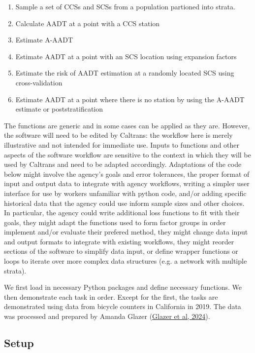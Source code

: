 \documentclass[11pt]{article}
\providecommand{\tightlist}{%
      \setlength{\itemsep}{0pt}\setlength{\parskip}{0pt}}
\begin{document}
\begin{enumerate}
\def\labelenumi{\arabic{enumi}.}
\tightlist
\item
  Sample a set of CCSs and SCSs from a population partioned into strata.
\item
  Calculate AADT at a point with a CCS station
\item
  Estimate A-AADT
\item
  Estimate AADT at a point with an SCS location using expansion factors
\item
  Estimate the risk of AADT estimation at a randomly located SCS using
  cross-validation
\item
  Estimate AADT at a point where there is no station by using the A-AADT
  estimate or poststratification
\end{enumerate}

The functions are generic and in some cases can be applied as they are. 
However, the software will need to be edited by Caltrans: the workflow here is merely illustrative and not intended for immediate use. 
Inputs to functions and other aspects of the software workflow are sensitive to the context in which they will be used by Caltrans and need to be adapted accordingly. 
Adaptations of the code below might involve the agency's goals and error tolerances, the proper format of input and output data to integrate with agency workflows, writing a simpler user interface for use by workers unfamiliar with python code, and/or adding specific historical data that the agency could use inform sample sizes and other choices. 
In particular, the agency could write additional loss functions to fit with their goals, they might adapt the functions used to form factor groups in order implement and/or evaluate their prefered method, they might change data input and output formats to integrate with existing workflows, they might reorder sections of the software to simplify data input, or define wrapper functions or loops to iterate over more complex data structures (e.g. a network with multiple strata).  


We first load in necessary Python packages and define necessary
functions. We then demonstrate each task in order. Except for the first,
the tasks are demonstrated using data from bicycle counters in
California in 2019. The data was processed and prepared by Amanda Glazer
(\href{https://www.researchgate.net/publication/377362665_DATA_CHECKS_FOR_BICYCLE_AND_PEDESTRIAN_COUNTS}{Glazer
et al, 2024}).

    \subsection{Setup}\label{setup}
\end{document}
